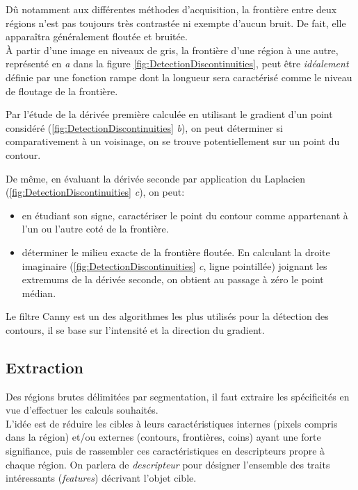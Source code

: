 \documentclass[a4paper,11pt]{report}
\begin{document}
Dû notamment aux différentes méthodes d'acquisition, la frontière entre deux régions n'est pas toujours très contrastée ni exempte d'aucun bruit. De fait, elle apparaîtra généralement floutée et bruitée.\\ 
\`A partir d'une image en niveaux de gris, la frontière d'une région à une autre, représenté en \textit{a} dans la figure \ref{fig:DetectionDiscontinuities}, peut être \textit{idéalement} définie par une fonction rampe dont la longueur sera caractérisé comme le niveau de floutage de la frontière. 

Par l'étude de la dérivée première calculée en utilisant le gradient d'un point considéré (\ref{fig:DetectionDiscontinuities} \textit{b}), on peut déterminer si comparativement à un voisinage, on se trouve potentiellement sur un point du contour. 

De même, en évaluant la dérivée seconde par application du Laplacien (\ref{fig:DetectionDiscontinuities} \textit{c}), on peut:\begin{itemize}
\item en étudiant son signe, caractériser le point du contour comme appartenant à l'un ou l'autre coté de la frontière.
\item déterminer le milieu exacte de la frontière floutée. En calculant la droite imaginaire (\ref{fig:DetectionDiscontinuities} \textit{c}, ligne pointillée) joignant les extremums de la dérivée seconde, on obtient au passage à zéro le point médian.\\
\end{itemize}

Le filtre Canny est un des algorithmes les plus utilisés pour la détection des contours, il se base sur l'intensité et la direction du gradient. 

\subsection{Extraction}

Des régions brutes délimitées par segmentation, il faut extraire les spécificités en vue d'effectuer les calculs souhaités.\\

L'idée est de réduire les cibles à leurs caractéristiques internes (pixels compris dans la région) et/ou externes (contours, frontières, coins) ayant une forte signifiance, puis de rassembler ces caractéristiques en descripteurs propre à chaque région. On parlera de \textit{descripteur} pour désigner l'ensemble des traits intéressants (\textit{features}) décrivant l'objet cible. 
\end{document}
